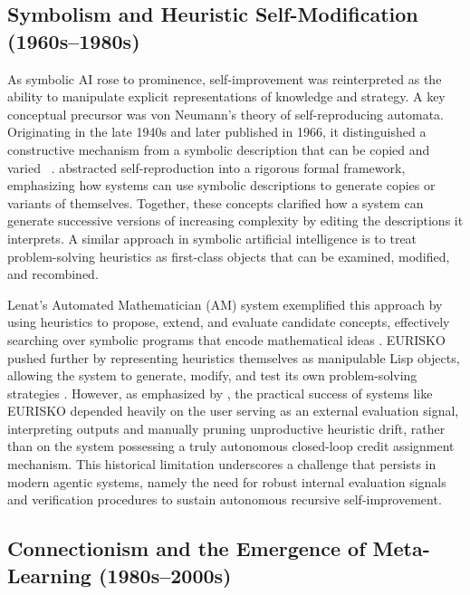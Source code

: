 \documentclass{article}
\begin{document}
\subsection{Symbolism and Heuristic Self-Modification (1960s–1980s)}
As symbolic AI rose to prominence, self-improvement was reinterpreted as the ability to manipulate explicit representations of knowledge and strategy. 
A key conceptual precursor was von Neumann's theory of self-reproducing automata. Originating in the late 1940s and later published in 1966, it distinguished a constructive mechanism from a symbolic description that can be copied and varied ~\citep{von1966theory}. \cite{myhill1964abstract} abstracted self-reproduction into a rigorous formal framework, emphasizing how systems can use symbolic descriptions to generate copies or variants of themselves. Together, these concepts clarified how a system can generate successive versions of increasing complexity by editing the descriptions it interprets. 
A similar approach in symbolic artificial intelligence is to treat problem-solving heuristics as first-class objects that can be examined, modified, and recombined.

 
Lenat’s Automated Mathematician (AM) system exemplified this approach by using heuristics to propose, extend, and evaluate candidate concepts, effectively searching over symbolic programs that encode mathematical ideas \citep{lenat11984automated}. EURISKO pushed further by representing heuristics themselves as manipulable Lisp objects, allowing the system to generate, modify, and test its own problem-solving strategies \citep{lenat1983eurisko, lenat1984and}. However, as emphasized by \cite{schmidhuber1987selfreferential}, the practical success of systems like EURISKO depended heavily on the user serving as an external evaluation signal, interpreting outputs and manually pruning unproductive heuristic drift, rather than on the system possessing a truly autonomous closed-loop credit assignment mechanism. This historical limitation underscores a challenge that persists in modern agentic systems, namely the need for robust internal evaluation signals and verification procedures to sustain autonomous recursive self-improvement. 



\subsection{Connectionism and the Emergence of Meta-Learning (1980s–2000s)}
\end{document}

